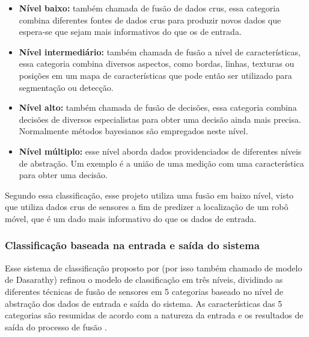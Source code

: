 \documentclass[acronym, symbols, table]{fei}
\begin{document}
				\begin{itemize}
					\item \textbf{Nível baixo:} também chamada de fusão de dados crus, essa categoria combina diferentes fontes de dados crus para produzir novos dados que espera-se que sejam mais informativos do que os de entrada.
					
					\item \textbf{Nível intermediário:} também chamada de fusão a nível de características, essa categoria combina diversos aspectos, como bordas, linhas, texturas ou posições em um mapa de características que pode então ser utilizado para segmentação ou detecção.
					
					\item \textbf{Nível alto:} também chamada de fusão de decisões, essa categoria combina decisões de diversos especialistas para obter uma decisão ainda mais precisa. Normalmente métodos bayesianos são empregados neste nível.
					
					\item \textbf{Nível múltiplo:} esse nível aborda dados providenciados de diferentes níveis de abstração. Um exemplo é a união de uma medição com uma característica para obter uma decisão.
				\end{itemize}
				
				Segundo essa classificação, esse projeto utiliza uma fusão em baixo nível, visto que utiliza dados crus de sensores a fim de predizer a localização de um robô móvel, que é um dado mais informativo do que os dados de entrada.
			
			\subsubsection{Classificação baseada na entrada e saída do sistema}
			
				Esse sistema de classificação proposto por \textcite{dasarathy1997sensor} (por isso também chamado de modelo de Dasarathy) refinou o modelo de classificação em três níveis, dividindo as diferentes técnicas de fusão de sensores em 5 categorias baseado no nível de abstração dos dados de entrada e saída do sistema. As características das 5 categorias são resumidas de acordo com a natureza da entrada e os resultados de saída do processo de fusão \cite{li2021data, vakil2021survey}. 
				
\end{document}
